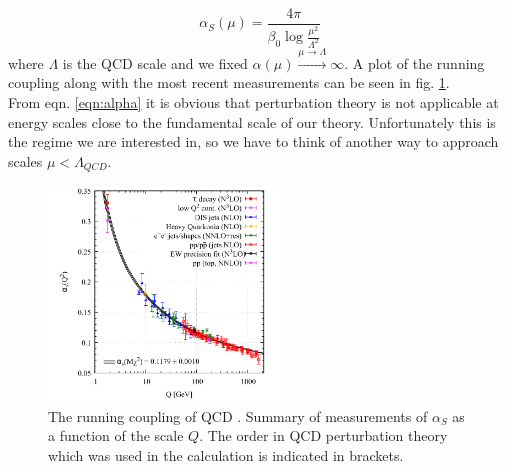 \begin{equation}
\label{eqn:alpha}
\alpha_S(\mu) = \frac{4\pi}{\beta_0 \log\frac{\mu^2}{\Lambda^2}} 
\end{equation}
where $\Lambda$ is the QCD scale and we fixed $\alpha(\mu) \overset{\mu \rightarrow \Lambda}{\longrightarrow} \infty$. A plot of the running coupling along with the most recent measurements can be seen in fig. \ref{fig:alpha}. \\
From eqn. \ref{eqn:alpha} it is obvious that perturbation theory is not applicable at energy scales close to the fundamental scale of our theory. Unfortunately this is the regime we are interested in, so we have to think of another way to approach scales $\mu < \Lambda_{QCD}$. 
\begin{figure}[t]
	\centering
	\includegraphics[width=0.55\textwidth]{Figures/alphaQCD}
	\caption{The running coupling of QCD \cite{PDG2018}. Summary of measurements of $\alpha_S$ as a function of the scale $Q$. The order in QCD perturbation theory which was used in the calculation is indicated in brackets.}
	\label{fig:alpha}
\end{figure}
